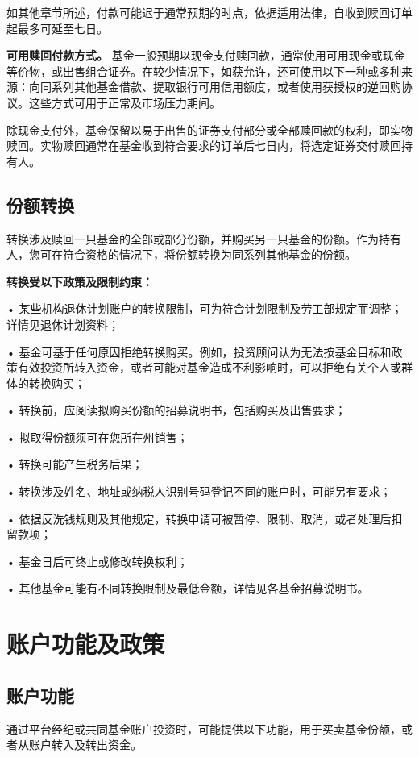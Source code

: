 \documentclass[UTF8,fontset=none,11pt,a4paper]{ctexart}
\begin{document}
如其他章节所述，付款可能迟于通常预期的时点，依据适用法律，自收到赎回订单起最多可\allowbreak\mbox{延至七日。}


\textbf{可用赎回付款方式。} 基金一般预期以现金支付赎回款，通常使用可用现金或现金等价物，或出售组合证券。在较少情况下，如获允许，还可使用以下一种或多种来源：向同系列其他基金借款、提取银行可用信用额度，或者使用获授权的逆回购协议。这些方式可用于正常及市场\allowbreak\mbox{压力期间。}


除现金支付外，基金保留以易于出售的证券支付部分或全部赎回款的权利，即实物赎回。实物赎回通常在基金收到符合要求的订单后七日内，将选定证券交付赎\allowbreak\mbox{回持有人。}


\subsection*{份额转换}
转换涉及赎回一只基金的全部或部分份额，并购买另一只基金的份额。作为持有人，您可在符合资格的情况下，将份额转换为同系列其他基\allowbreak\mbox{金的份额。}


\textbf{转换受以下政策及限制约束：}


• 某些机构退休计划账户的转换限制，可为符合计划限制及劳工部规定而调整；详情见退休\allowbreak\mbox{计划资料；}


• 基金可基于任何原因拒绝转换购买。例如，投资顾问认为无法按基金目标和政策有效投资所转入资金，或者可能对基金造成不利影响时，可以拒绝有关个人或群体的\allowbreak\mbox{转换购买；}


• 转换前，应阅读拟购买份额的招募说明书，包括购买及\allowbreak\mbox{出售要求；}


• 拟取得份额须可在您所\allowbreak\mbox{在州销售；}


• 转换可能产生\allowbreak\mbox{税务后果；}


• 转换涉及姓名、地址或纳税人识别号码登记不同的账户时，可能\allowbreak\mbox{另有要求；}


• 依据反洗钱规则及其他规定，转换申请可被暂停、限制、取消，或者处理后\allowbreak\mbox{扣留款项；}


• 基金日后可终止或修改\allowbreak\mbox{转换权利；}


• 其他基金可能有不同转换限制及最低金额，详情见各基金招\allowbreak\mbox{募说明书。}


\section*{账户功能及政策}
\subsection*{账户功能}
通过平台经纪或共同基金账户投资时，可能提供以下功能，用于买卖基金份额，或者从账户转入及\allowbreak\mbox{转出资金。}
\end{document}
